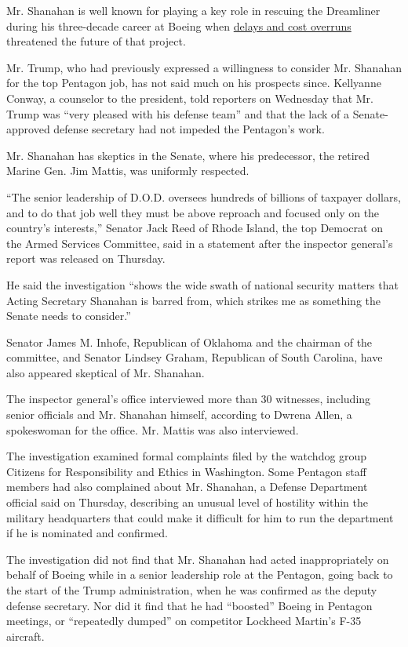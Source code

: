 Mr. Shanahan is well known for playing a key role in rescuing the
Dreamliner during his three-decade career at Boeing when
\href{https://www.nytimes.com/2017/04/01/business/patrick-shanahan-pentagon-nominee.html}{delays
and cost overruns} threatened the future of that project.

Mr. Trump, who had previously expressed a willingness to consider Mr.
Shanahan for the top Pentagon job, has not said much on his prospects
since. Kellyanne Conway, a counselor to the president, told reporters on
Wednesday that Mr. Trump was ``very pleased with his defense team'' and
that the lack of a Senate-approved defense secretary had not impeded the
Pentagon's work.

Mr. Shanahan has skeptics in the Senate, where his predecessor, the
retired Marine Gen. Jim Mattis, was uniformly respected.

``The senior leadership of D.O.D. oversees hundreds of billions of
taxpayer dollars, and to do that job well they must be above reproach
and focused only on the country's interests,'' Senator Jack Reed of
Rhode Island, the top Democrat on the Armed Services Committee, said in
a statement after the inspector general's report was released on
Thursday.

He said the investigation ``shows the wide swath of national security
matters that Acting Secretary Shanahan is barred from, which strikes me
as something the Senate needs to consider.''

Senator James M. Inhofe, Republican of Oklahoma and the chairman of the
committee, and Senator Lindsey Graham, Republican of South Carolina,
have also appeared skeptical of Mr. Shanahan.

The inspector general's office interviewed more than 30 witnesses,
including senior officials and Mr. Shanahan himself, according to Dwrena
Allen, a spokeswoman for the office. Mr. Mattis was also interviewed.

The investigation examined formal complaints filed by the watchdog group
Citizens for Responsibility and Ethics in Washington. Some Pentagon
staff members had also complained about Mr. Shanahan, a Defense
Department official said on Thursday, describing an unusual level of
hostility within the military headquarters that could make it difficult
for him to run the department if he is nominated and confirmed.

The investigation did not find that Mr. Shanahan had acted
inappropriately on behalf of Boeing while in a senior leadership role at
the Pentagon, going back to the start of the Trump administration, when
he was confirmed as the deputy defense secretary. Nor did it find that
he had ``boosted'' Boeing in Pentagon meetings, or ``repeatedly dumped''
on competitor Lockheed Martin's F-35 aircraft.

